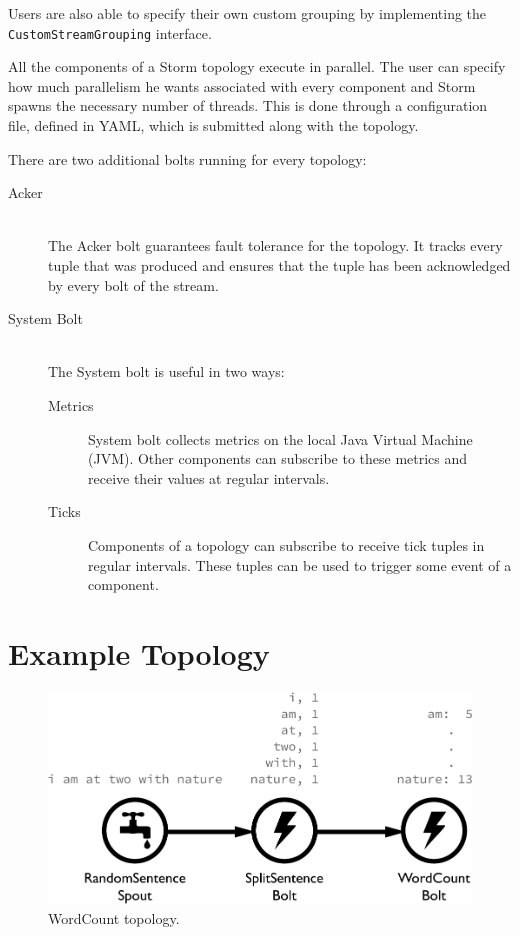 \documentclass[bsc,logo,frontabs,twoside,singlespacing,normalheadings,parskip]{infthesis}\usepackage[]{graphicx}\usepackage[]{color}
\begin{document}
Users are also able to specify their own custom grouping by implementing the \texttt{CustomStreamGrouping} interface.

All the components of a Storm topology execute in parallel. The user can specify how much parallelism he wants associated with every component and Storm spawns the necessary number of threads. This is done through a configuration file, defined in YAML, which is submitted along with the topology.

There are two additional bolts running for every topology:

\begin{description}
	\item[Acker] \hfill \\
	The Acker bolt guarantees fault tolerance for the topology. It tracks every tuple that was produced and ensures that the tuple has been acknowledged by every bolt of the stream.
	\item[System Bolt] \hfill \\
	The System bolt is useful in two ways:
	\begin{description}
		\item[Metrics] System bolt collects metrics on the local Java Virtual Machine (JVM). Other components can subscribe to these metrics and receive their values at  regular intervals.
		\item[Ticks] Components of a topology can subscribe to receive tick tuples in regular intervals. These tuples can be used to trigger some event of a component.
	\end{description}
\end{description}

\section{Example Topology}
\label{sec:example_topology}

\begin{figure}[!htb]
	\centering
	\includegraphics[scale=0.7]{pdf/wordcount_topology.pdf}
	\caption{WordCount topology.}
	\label{fig:wordcount_topology}
\end{figure}
\end{document}
